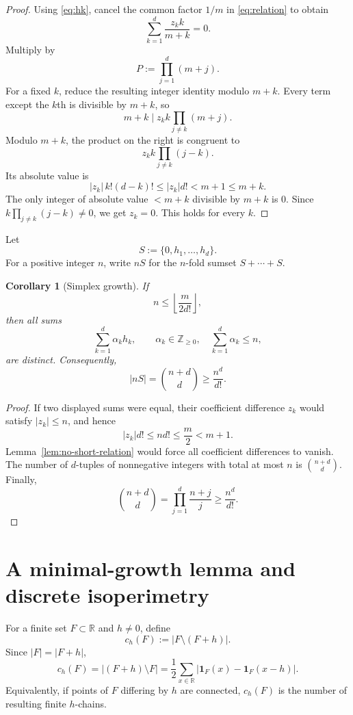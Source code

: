 \documentclass[11pt]{article}
\newtheorem{corollary}[theorem]{Corollary}
\theoremstyle{definition}
\newcommand{\R}{\mathbb{R}}
\newcommand{\Z}{\mathbb{Z}}
\newcommand{\1}{\mathbf{1}}
\begin{document}
\begin{proof}
Using \eqref{eq:hk}, cancel the common factor $1/m$ in \eqref{eq:relation} to obtain
\[
  \sum_{k=1}^d\frac{z_kk}{m+k}=0.
\]
Multiply by
\[
  P:=\prod_{j=1}^d(m+j).
\]
For a fixed $k$, reduce the resulting integer identity modulo $m+k$.  Every term except the $k$th is divisible by $m+k$, so
\[
  m+k\mid z_kk\prod_{j\ne k}(m+j).
\]
Modulo $m+k$, the product on the right is congruent to
\[
  z_kk\prod_{j\ne k}(j-k).
\]
Its absolute value is
\[
  |z_k|\,k!(d-k)!\le |z_k|d!<m+1\le m+k.
\]
The only integer of absolute value $<m+k$ divisible by $m+k$ is $0$.  Since $k\prod_{j\ne k}(j-k)\ne0$, we get $z_k=0$.  This holds for every $k$.
\end{proof}

Let
\begin{equation}\label{eq:S}
  S:=\{0,h_1,\ldots,h_d\}.
\end{equation}
For a positive integer $n$, write $nS$ for the $n$-fold sumset $S+\cdots+S$.

\begin{corollary}[Simplex growth]\label{cor:simplex-growth}
If
\begin{equation}\label{eq:n-range}
  n\le\left\lfloor\frac{m}{2d!}\right\rfloor,
\end{equation}
then all sums
\[
  \sum_{k=1}^d \alpha_kh_k,
  \qquad
  \alpha_k\in\Z_{\ge0},\quad
  \sum_{k=1}^d\alpha_k\le n,
\]
are distinct.  Consequently,
\begin{equation}\label{eq:nS-count}
  |nS|=\binom{n+d}{d}\ge\frac{n^d}{d!}.
\end{equation}
\end{corollary}

\begin{proof}
If two displayed sums were equal, their coefficient difference $z_k$ would satisfy $|z_k|\le n$, and hence
\[
  |z_k|d!\le nd!\le\frac m2<m+1.
\]
Lemma~\ref{lem:no-short-relation} would force all coefficient differences to vanish.  The number of $d$-tuples of nonnegative integers with total at most $n$ is $\binom{n+d}{d}$.  Finally,
\[
  \binom{n+d}{d}=\prod_{j=1}^d\frac{n+j}{j}\ge\frac{n^d}{d!}.
\]
\end{proof}

\section{A minimal-growth lemma and discrete isoperimetry}

For a finite set $F\subset\R$ and $h\ne0$, define
\begin{equation}\label{eq:ch}
  c_h(F):=|F\setminus(F+h)|.
\end{equation}
Since $|F|=|F+h|$,
\begin{equation}\label{eq:ch-other}
  c_h(F)=|(F+h)\setminus F|
  =\frac12\sum_{x\in\R}|\1_F(x)-\1_F(x-h)|.
\end{equation}
Equivalently, if points of $F$ differing by $h$ are connected, $c_h(F)$ is the number of resulting finite $h$-chains.
\end{document}
